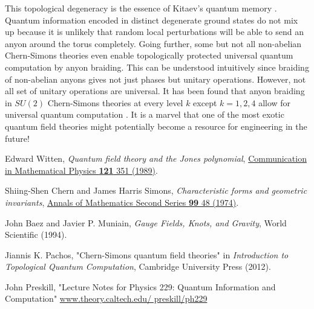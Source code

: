 \documentclass[aps,nofootinbib]{revtex4}
\begin{document}
This topological degeneracy is the essence of Kitaev's quantum memory \cite{Preskill}. Quantum information encoded in distinct degenerate ground states do not mix up because it is unlikely that random local perturbations will be able to send an anyon around the torus completely. Going further, some but not all non-abelian Chern-Simons theories even enable topologically protected universal quantum computation by anyon braiding. This can be understood intuitively since braiding of non-abelian anyons gives not just phases but unitary operations. However, not all set of unitary operations are universal. It has been found that anyon braiding in $SU(2)$ Chern-Simons theories at every level $k$ except $k=1,2,4$ allow for universal quantum computation \cite{Pachos12}. It is a marvel that one of the most exotic quantum field theories might potentially become a resource for engineering in the future!

\begin{thebibliography}{99}

Edward Witten, \emph{Quantum field theory and the Jones polynomial}, \href{http://link.springer.com/article/10.1007/BF01217730}{Communication in Mathematical Physics {\bf 121} 351 (1989)}.

Shiing-Shen Chern and James Harris Simons, \emph{Characteristic forms and geometric invariants}, \href{https://www.jstor.org/stable/1971013}{Annals of Mathematics
Second Series {\bf 99} 48 (1974)}.

John Baez and Javier P. Muniain, \emph{Gauge Fields, Knots, and Gravity}, World Scientific (1994).


Jiannis K. Pachos, "Chern-Simons quantum field theories" in \emph{Introduction to Topological Quantum Computation}, Cambridge University Press (2012).

John Preskill, "Lecture Notes for Physics 229: Quantum Information and Computation" \href{http://www.theory.caltech.edu/ preskill/ph229}{www.theory.caltech.edu/ preskill/ph229}


\end{thebibliography}
\end{document}
